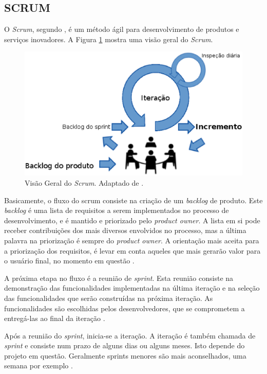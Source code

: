 \subsection{SCRUM}
\label{scrum_sec}

O \emph{Scrum}, segundo , é um método ágil para desenvolvimento de produtos e serviços inovadores. 
A Figura \ref{scrum_geral} mostra uma visão geral do \emph{Scrum}.
\begin{figure}[ht]
	\centering
	\includegraphics[width=15cm]{figuras/scrum_geral.eps}
	\caption{Visão Geral do \emph{Scrum}. Adaptado de \cite{Schwaber2004}.}
	\label{scrum_geral}
\end{figure}

Basicamente, o fluxo do scrum consiste na criação de um \emph{backlog} de produto. 
Este \emph{backlog} é uma lista de requisitos a serem implementados no processo de desenvolvimento, e é mantido e priorizado pelo \emph{product owner}. 
A lista em si pode receber contribuições dos mais diversos envolvidos no processo, mas a última palavra na priorização é sempre do \emph{product owner}.
A orientação mais aceita para a priorização dos requisitos, é levar em conta aqueles que mais gerarão valor para o usuário final, no momento em questão \cite{Schwaber2001}.

A próxima etapa no fluxo é a reunião de \emph{sprint}. 
Esta reunião consiste na demonstração das funcionalidades implementadas na última iteração e na seleção das funcionalidades que serão construídas na próxima iteração.
As funcionalidades são escolhidas pelos desenvolvedores, que se comprometem a entregá-las ao final da iteração \cite{Schwaber2004}.

Após a reunião do \emph{sprint}, inicia-se a iteração. A iteração é também chamada de \emph{sprint} e consiste num prazo de alguns dias ou alguns meses. 
Isto depende do projeto em questão. Geralmente sprints menores são mais aconselhados, uma semana por exemplo \cite{Schwaber2004}.

